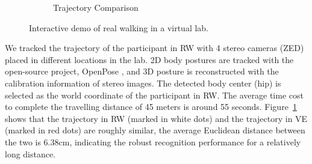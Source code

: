 \documentclass[review]{vgtc}                 %
\begin{document}
\begin{figure}[!htpb]
\begin{subfigure}{\linewidth}
		\caption[]{\label{fig:lab_comparison} Trajectory Comparison
		}
	\end{subfigure}				
	\caption[]{\label{fig:lab}
		Interactive demo of real walking in a virtual lab.
	}
\end{figure}

We tracked the trajectory of the participant in RW with 4 stereo cameras (ZED) placed in different locations in the lab.
2D body postures are tracked with the open-source project, OpenPose \cite{cao2017realtime}, and 3D posture is reconstructed with the calibration information of stereo images.
The detected body center (hip) is selected as the world coordinate of the participant in RW.
The average time cost to complete the travelling distance of 45 meters is around 55 seconds. 
Figure~\ref{fig:lab_comparison} shows that the trajectory in RW (marked in white dots) and the trajectory in VE (marked in red dots) are roughly similar, the average Euclidean distance between the two is 6.38cm, indicating the robust recognition performance for a relatively long distance.
\end{document}
